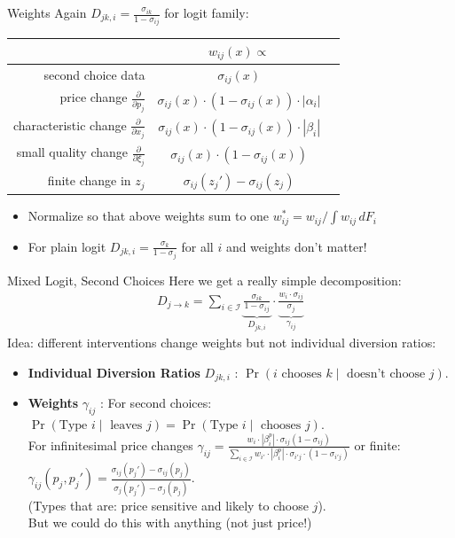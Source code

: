 \documentclass[aspectratio=169,10pt]{beamer}
\begin{document}
\begin{frame}{Weights}
Again $D_{jk,i} = \frac{\sigma_{ik}}{1-\sigma_{ij}}$ for logit family:\\
\begin{center}
\begin{tabular}{rcc} 
& $w_{i j}(x) \propto$ \\
\midrule second choice data & $\sigma_{i j}(x)$ \\
price change $\frac{\partial}{\partial p_{j}}$ & $\sigma_{i j}(x) \cdot\left(1-\sigma_{i j}(x)\right) \cdot\left|\alpha_{i}\right|$ \\
characteristic change $\frac{\partial}{\partial x_{j}}$ & $\sigma_{i j}(x) \cdot\left(1-\sigma_{i j}(x)\right) \cdot\left|\beta_{i}\right|$ \\
small quality change $\frac{\partial}{\partial \xi_{j}}$ & $\sigma_{i j}(x) \cdot\left(1-\sigma_{i j}(x)\right)$ \\
finite change in $z_j$ & $\sigma_{ij}(z_j') - \sigma_{ij}(z_j)$\\
\midrule
\end{tabular}
\end{center}
\begin{itemize}
\item Normalize so that above weights sum to one $w_{ij}^* = w_{ij}/\int w_{ij} \, d F_i$
\item For plain logit $D_{jk,i} = \frac{\sigma_{k}}{1-\sigma_{j}}$ for all $i$ and weights don't matter!
\end{itemize}
\end{frame}

\begin{frame}{Mixed Logit, Second Choices}
Here we get a really simple decomposition:
\begin{align*}
D_{j \rightarrow k} = \sum_{i \in \mathcal{I}} \underbrace{\frac{\sigma_{ik}}{1-\sigma_{ij}}}_{D_{jk,i}} \cdot \underbrace{\frac{w_i \cdot \sigma_{ij}}{\sigma_{j}}}_{\gamma_{ij}}
\end{align*}
Idea: different interventions change \alert{weights} but not \alert{individual diversion ratios}:
\begin{itemize}
\item \textbf{Individual Diversion Ratios} $D_{jk,i}$ : $\Pr( i \text{ chooses } k \mid \text{ doesn't choose } j)$.

\item \textbf{Weights} $\gamma_{ij}$ : For second choices: $\Pr(\text{Type } i \mid \text{ leaves } j) =\Pr(\text{Type } i \mid \text{ chooses } j)$.\\ For infinitesimal price changes $\gamma_{ij}=\frac{w_i \cdot |\beta_i^p| \cdot \sigma_{ij}(1-\sigma_{ij})}{\sum_{i
 \in \mathcal{I}} w_{i'} \cdot |\beta_i^p| \cdot \sigma_{i'j}\cdot(1-\sigma_{i'j})}$ or finite: $\gamma_{ij}(p_j,p_j')=\frac{\sigma_{ij}(p_j')-\sigma_{ij}(p_j)}{\sigma_{j}(p_j')-\sigma_{j}(p_j)}$.\\
 (Types that are: price sensitive and likely to choose $j$).\\
 But we could do this with anything (not just price!)
\end{itemize}
\end{frame}
\end{document}
